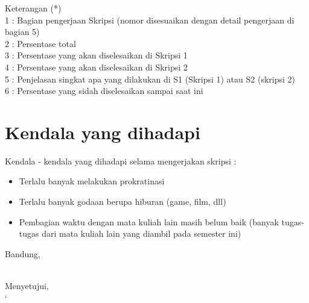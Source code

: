 \documentclass[a4paper,twoside]{article}
\begin{document}
Keterangan (*)\\
1 : Bagian pengerjaan Skripsi (nomor disesuaikan dengan detail pengerjaan di bagian 5)\\
2 : Persentase total \\
3 : Persentase yang akan diselesaikan di Skripsi 1 \\
4 : Persentase yang akan diselesaikan di Skripsi 2 \\
5 : Penjelasan singkat apa yang dilakukan di S1 (Skripsi 1) atau S2 (skripsi 2)\\
6 : Persentase yang sidah diselesaikan sampai saat ini 

\section{Kendala yang dihadapi}
Kendala - kendala yang dihadapi selama mengerjakan skripsi :
\begin{itemize}
	\item Terlalu banyak melakukan prokratinasi
	\item Terlalu banyak godaan berupa hiburan (game, film, dll)
	\item Pembagian waktu dengan mata kuliah lain masih belum baik (banyak tugas-tugas dari mata kuliah lain yang diambil pada semester ini)
\end{itemize}

\vspace{1cm}
\centering Bandung, \tanggal\\
\vspace{2cm} \nama \\ 
\vspace{1cm}

Menyetujui, \\
`
\end{document}
